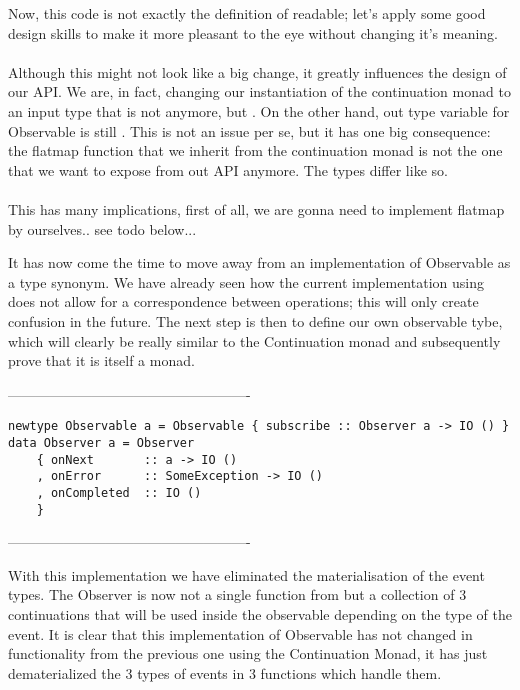 Now, this code is not exactly the definition of readable; let's apply some good design skills to make it more pleasant to the eye without changing it's meaning.\\

\\

Although this might not look like a big change, it greatly influences the design of our API. We are, in fact, changing our instantiation of the continuation monad to an input type that is not  anymore, but . On the other hand, out type variable for Observable is still . This is not an issue per se, but it has one big consequence: the flatmap function that we inherit from the continuation monad is not the one that we want to expose from out API anymore. The types differ like so.\\

\\

This has many implications, first of all, we are gonna need to implement flatmap by ourselves.. see todo below...

It has now come the time to move away from an implementation of Observable as a type synonym. We have already seen how the current implementation using  does not allow for a correspondence between \code{>>=} operations; this will only create confusion in the future. The next step is then to define our own observable tybe, which will clearly be really similar to the Continuation monad and subsequently prove that it is itself a monad. 

----------------------------------------------------
\begin{verbatim}
newtype Observable a = Observable { subscribe :: Observer a -> IO () } 
data Observer a = Observer 
    { onNext       :: a -> IO ()
    , onError      :: SomeException -> IO ()
    , onCompleted  :: IO ()
    }
\end{verbatim}
----------------------------------------------------    

With this implementation we have eliminated the materialisation of the event types. The Observer is now not a single function from  but a collection of 3 continuations that will be used inside the observable depending on the type of the event. It is clear that this implementation of Observable has not changed in functionality from the previous one using the Continuation Monad, it has just dematerialized the 3 types of events in 3 functions which handle them.


